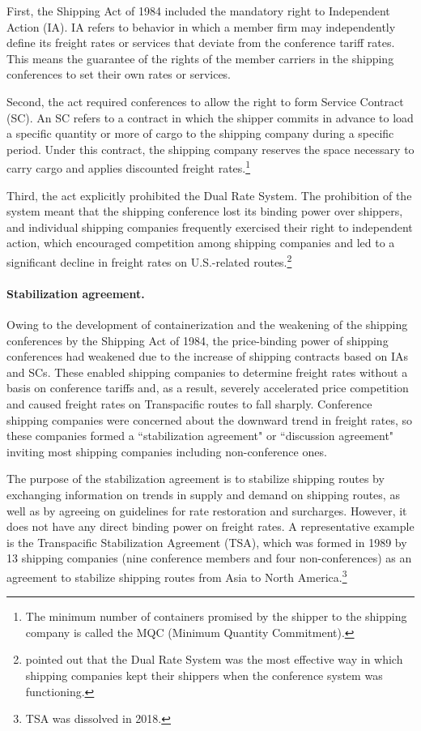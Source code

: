 \documentclass[11pt]{article}
\begin{document}
First, the Shipping Act of 1984 included the mandatory right to Independent Action (IA). IA refers to behavior in which a member firm may independently define its freight rates or services that deviate from the conference tariff rates. This means the guarantee of the rights of the member carriers in the shipping conferences to set their own rates or services.

Second, the act required conferences to allow the right to form Service Contract (SC). An SC refers to a contract in which the shipper commits in advance to load a specific quantity or more of cargo to the shipping company during a specific period. Under this contract, the shipping company reserves the space necessary to carry cargo and applies discounted freight rates.\footnote{The minimum number of containers promised by the shipper to the shipping company is called the MQC (Minimum Quantity Commitment).}

Third, the act explicitly prohibited the Dual Rate System. The prohibition of the system meant that the shipping conference lost its binding power over shippers, and individual shipping companies frequently exercised their right to independent action, which encouraged competition among shipping companies and led to a significant decline in freight rates on U.S.-related routes.\footnote{\cite{JMC2008} pointed out that the Dual Rate System was the most effective way in which shipping companies kept their shippers when the conference system was functioning.}  

\paragraph{Stabilization agreement.}
Owing to the development of containerization and the weakening of the shipping conferences by the Shipping Act of 1984, the price-binding power of shipping conferences had weakened due to the increase of shipping contracts based on IAs and SCs. These enabled shipping companies to determine freight rates without a basis on conference tariffs and, as a result, severely accelerated price competition and caused freight rates on Transpacific routes to fall sharply. Conference shipping companies were concerned about the downward trend in freight rates, so these companies formed a ``stabilization agreement" or ``discussion agreement" inviting most shipping companies including non-conference ones.

The purpose of the stabilization agreement is to stabilize shipping routes by exchanging information on trends in supply and demand on shipping routes, as well as by agreeing on guidelines for rate restoration and surcharges. However, it does not have any direct binding power on freight rates. A representative example is the Transpacific Stabilization Agreement (TSA), which was formed in 1989 by 13 shipping companies (nine conference members and four non-conferences) as an agreement to stabilize shipping routes from Asia to North America.\footnote{TSA was dissolved in 2018.} 
\end{document}
